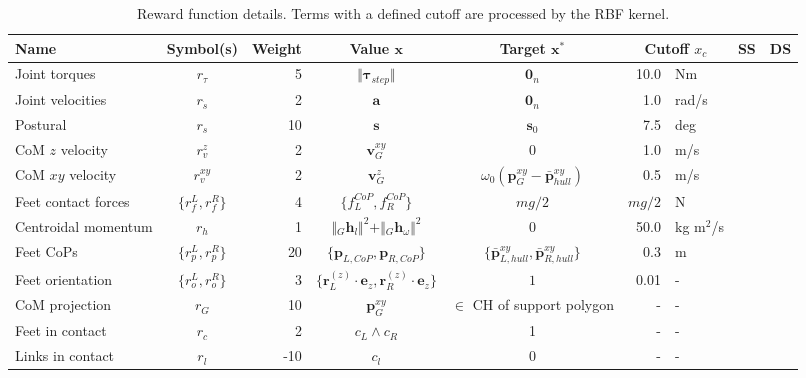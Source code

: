 \begin{table}
    \center
    \caption{Reward function details. Terms with a defined cutoff are processed by the RBF kernel.}
    \label{tab:reward}
    \newcommand{\ck}{\checkmark}
    \setlength\extrarowheight{2pt}
    \begin{tabular}{lcrccrlrr}
        \toprule
        Name & Symbol(s) & Weight & Value $\mathbf{x}$ & Target $\mathbf{x}^*$ & \multicolumn{2}{c}{Cutoff $x_c$}  & SS & DS \\
        \midrule \rowcolor{black!10}
        Joint torques & $r_\tau$ & 5 & $\Vert \boldsymbol{\tau}_{step} \Vert $ & $\boldsymbol{0}_n$ & 10.0 & Nm & \ck & \ck \\
        Joint velocities & $r_{\dot{s}}$ & 2 & $\boldsymbol{a}$ & $\boldsymbol{0}_n$ & 1.0 & rad/s & \ck & \ck \\ \rowcolor{black!10}
        Postural & $r_{s}$ & 10 & $\boldsymbol{s}$ & $\boldsymbol{s}_0$ & 7.5 & deg & & \ck \\
        CoM $z$ velocity & $r_{v}^z$ & 2 & $\boldsymbol{v}^{xy}_{G}$ & $0$ & 1.0 & m/s & \ck & \ck \\ \rowcolor{black!10}
        CoM $xy$ velocity & $r_{v}^{xy}$ & 2 & $\boldsymbol{v}^{z}_{G}$ & $\omega_0 (\boldsymbol{p}^{xy}_{G} - \boldsymbol{\bar{p}}^{xy}_{hull})$ & 0.5 & m/s & & \ck \\
        Feet contact forces & $\{r_{f}^L, r_{f}^R\}$ & 4 & $\{f^{CoP}_L, f^{CoP}_R\}$ & $m g / 2$ & $m g / 2$ & N & \ck & \ck \\ \rowcolor{black!10}
        Centroidal momentum & $r_h$ & 1 & $\Vert {}_{G} \mathbf{h}_l \Vert^2 + \Vert {}_{G} \mathbf{h}_\omega \Vert^2$ & 0 & 50.0 & kg m$^2$/s & \ck & \ck \\
        Feet CoPs & $\{r_{p}^L, r_{p}^R\}$ & 20 & $\{\boldsymbol{p}_{L, CoP}, \boldsymbol{p}_{R, CoP}\}$ & $\{\bar{\boldsymbol{p}}^{xy}_{L, hull}, \bar{\boldsymbol{p}}^{xy}_{R, hull}\}$ & 0.3 & m & \ck & \ck \\ \rowcolor{black!10}
        Feet orientation & $\{r_{o}^L, r_{o}^R\}$ & 3 & $\{\mathbf{r}^{(z)}_L \cdot \mathbf{e}_z, \mathbf{r}^{(z)}_R \cdot \mathbf{e}_z\}$ & $1$ & 0.01 & - & \ck & \ck \\
        CoM projection & $r_{G}$ & 10 & $\boldsymbol{p}^{xy}_{G}$ & $\in$ CH of support polygon & \multicolumn{1}{r}{-} & - & & \ck \\ \rowcolor{black!10}
        Feet in contact & $r_{c}$ & 2 & $c_L \land c_R$ & 1 & \multicolumn{1}{r}{-} & - & \ck & \ck \\
        Links in contact & $r_l$ & -10 & $c_{l}$ & $0$ & \multicolumn{1}{r}{-} & - & \ck & \ck \\
        \bottomrule
    \end{tabular}
\end{table}

